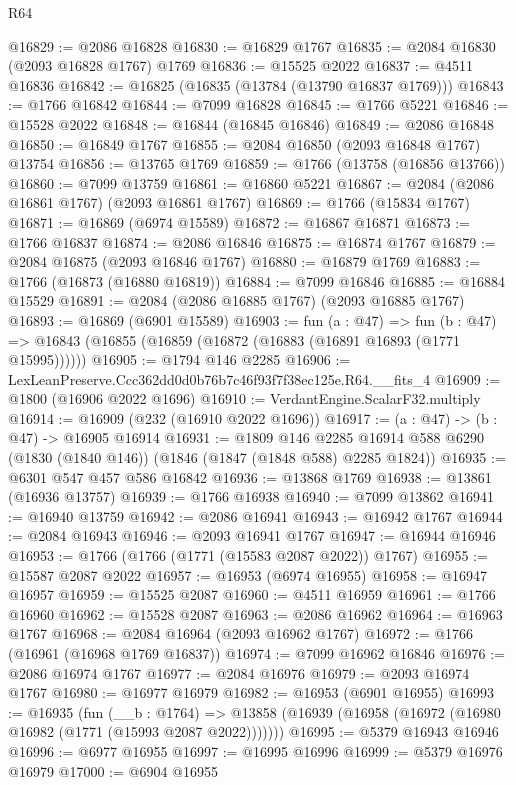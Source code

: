 \begin{lexlean}{R64}
\begin{coremodule}
@16829 := @2086 @16828
@16830 := @16829 @1767
@16835 := @2084 @16830 (@2093 @16828 @1767) @1769
@16836 := @15525 @2022
@16837 := @4511 @16836
@16842 := @16825 (@16835 (@13784 (@13790 @16837 @1769)))
@16843 := @1766 @16842
@16844 := @7099 @16828
@16845 := @1766 @5221
@16846 := @15528 @2022
@16848 := @16844 (@16845 @16846)
@16849 := @2086 @16848
@16850 := @16849 @1767
@16855 := @2084 @16850 (@2093 @16848 @1767) @13754
@16856 := @13765 @1769
@16859 := @1766 (@13758 (@16856 @13766))
@16860 := @7099 @13759
@16861 := @16860 @5221
@16867 := @2084 (@2086 @16861 @1767) (@2093 @16861 @1767)
@16869 := @1766 (@15834 @1767)
@16871 := @16869 (@6974 @15589)
@16872 := @16867 @16871
@16873 := @1766 @16837
@16874 := @2086 @16846
@16875 := @16874 @1767
@16879 := @2084 @16875 (@2093 @16846 @1767)
@16880 := @16879 @1769
@16883 := @1766 (@16873 (@16880 @16819))
@16884 := @7099 @16846
@16885 := @16884 @15529
@16891 := @2084 (@2086 @16885 @1767) (@2093 @16885 @1767)
@16893 := @16869 (@6901 @15589)
@16903 := fun (a : @47) =>
  fun (b : @47) => @16843 (@16855 (@16859 (@16872 (@16883 (@16891 @16893 (@1771 @15995))))))
@16905 := @1794 @146 @2285
@16906 := LexLeanPreserve.Ccc362dd0d0b76b7c46f93f7f38ec125e.R64.__fits_4
@16909 := @1800 (@16906 @2022 @1696)
@16910 := VerdantEngine.ScalarF32.multiply
@16914 := @16909 (@232 (@16910 @2022 @1696))
@16917 := (a : @47) -> (b : @47) -> @16905 @16914
@16931 := @1809
    @146
    @2285
    @16914
    @588
    @6290
    (@1830 (@1840 @146))
    (@1846 (@1847 (@1848 @588) @2285 @1824))
@16935 := @6301 @547 @457 @586 @16842
@16936 := @13868 @1769
@16938 := @13861 (@16936 @13757)
@16939 := @1766 @16938
@16940 := @7099 @13862
@16941 := @16940 @13759
@16942 := @2086 @16941
@16943 := @16942 @1767
@16944 := @2084 @16943
@16946 := @2093 @16941 @1767
@16947 := @16944 @16946
@16953 := @1766 (@1766 (@1771 (@15583 @2087 @2022)) @1767)
@16955 := @15587 @2087 @2022
@16957 := @16953 (@6974 @16955)
@16958 := @16947 @16957
@16959 := @15525 @2087
@16960 := @4511 @16959
@16961 := @1766 @16960
@16962 := @15528 @2087
@16963 := @2086 @16962
@16964 := @16963 @1767
@16968 := @2084 @16964 (@2093 @16962 @1767)
@16972 := @1766 (@16961 (@16968 @1769 @16837))
@16974 := @7099 @16962 @16846
@16976 := @2086 @16974 @1767
@16977 := @2084 @16976
@16979 := @2093 @16974 @1767
@16980 := @16977 @16979
@16982 := @16953 (@6901 @16955)
@16993 := @16935
    (fun (__b : @1764) =>
    @13858 (@16939 (@16958 (@16972 (@16980 @16982 (@1771 (@15993 @2087 @2022)))))))
@16995 := @5379 @16943 @16946
@16996 := @6977 @16955
@16997 := @16995 @16996
@16999 := @5379 @16976 @16979
@17000 := @6904 @16955

\end{coremodule}
\end{lexlean}
